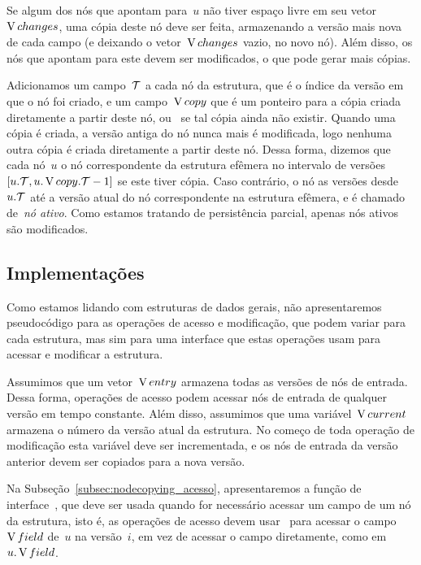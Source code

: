 \documentclass[main.tex]{subfiles}
\begin{document}
Se algum dos nós que apontam para~$u$ não tiver espaço livre em seu vetor~$\operatorname{V}{changes}$, uma cópia deste nó deve ser feita, armazenando a versão mais nova de cada campo (e deixando o vetor~$\operatorname{V}{changes}$ vazio, no novo nó). Além disso, os nós que apontam para este devem ser modificados, o que pode gerar mais cópias.

Adicionamos um campo~$\mathcal{T}$ a cada nó da estrutura, que é o índice da versão em que o nó foi criado, e um campo~$\operatorname{V}{copy}$ que é um ponteiro para a cópia criada diretamente a partir deste nó, ou~ se tal cópia ainda não existir. Quando uma cópia é criada, a versão antiga do nó nunca mais é modificada, logo nenhuma outra cópia é criada diretamente a partir deste nó. Dessa forma, dizemos que cada nó~$u$  o nó correspondente da estrutura efêmera no intervalo de versões~${[u.\mathcal{T}, u.\operatorname{V}{copy}.\mathcal{T} - 1]}$ se este tiver cópia. Caso contrário, o nó  as versões desde~$u.\mathcal{T}$ até a versão atual do nó correspondente na estrutura efêmera, e é chamado de~\emph{nó ativo}. Como estamos tratando de persistência parcial, apenas nós ativos são modificados.

\subsection{Implementações}

Como estamos lidando com estruturas de dados gerais, não apresentaremos pseudocódigo para as operações de acesso e modificação, que podem variar para cada estrutura, mas sim para uma interface que estas operações usam para acessar e modificar a estrutura.

\newcommand{\cur}{\V{current}}
Assumimos que um vetor~$\operatorname{V}{entry}$ armazena todas as versões de nós de entrada. Dessa forma, operações de acesso podem acessar nós de entrada de qualquer versão em tempo constante. Além disso, assumimos que uma variável~$\cur$ armazena o número da versão atual da estrutura. No começo de toda operação de modificação esta variável deve ser incrementada, e os nós de entrada da versão anterior devem ser copiados para a nova versão.

Na Subseção~\ref{subsec:nodecopying_acesso}, apresentaremos a função de interface~, que deve ser usada quando for necessário acessar um campo de um nó da estrutura, isto é, as operações de acesso devem usar~ para acessar o campo~$\operatorname{V}{field}$ de~$u$ na versão~$i$, em vez de acessar o campo diretamente, como em~${u.\operatorname{V}{field}}$.
\end{document}
